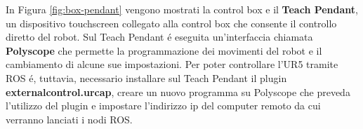 In Figura \ref{fig:box-pendant} vengono mostrati la control box e il \textbf{Teach Pendant}, un dispositivo touchscreen collegato 
alla control box che consente il controllo diretto del robot. Sul Teach Pendant \'{e} eseguita un'interfaccia chiamata \textbf{Polyscope} 
che permette la programmazione dei movimenti del robot e il cambiamento di alcune sue impostazioni. 
Per poter controllare l'UR5 tramite ROS \'{e}, tuttavia, necessario installare sul Teach Pendant il plugin \textbf{externalcontrol.urcap}, 
creare un nuovo programma su Polyscope che preveda l'utilizzo del plugin e impostare l'indirizzo ip del computer remoto da cui 
verranno lanciati i nodi ROS.

